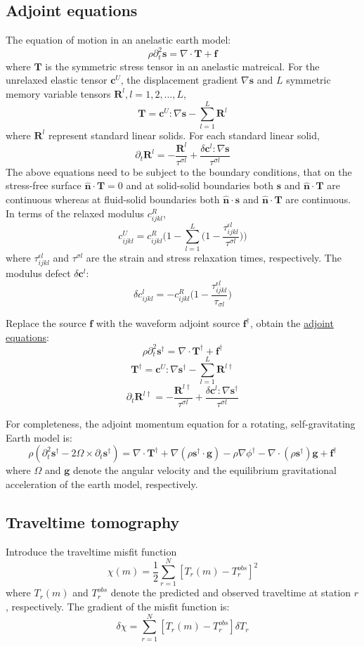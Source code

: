 \documentclass{article}
\newcommand{\mbf}[1]{\mathbf{#1}}
\newcommand{\myem}[1]{{\color{red}\uline{#1}}}
\begin{document}
\subsection{Adjoint equations}
The equation of motion in an anelastic earth model:
\[ \rho\partial_t^2\mbf s=\nabla\cdot\mbf T+\mbf f \]
where $\mbf T$ is the symmetric stress tensor in an anelastic matreical. For the unrelaxed elastic tensor $\mbf c^U$, the displacement gradient $\nabla\mbf s$ and $L$ symmetric memory variable tensors $\mbf R^l,l=1,2,\ldots,L$,
\[ \mbf T=\mbf c^U:\nabla\mbf s-\sum_{l=1}^L\mbf R^l \]
where $\mbf R^l$ represent standard linear solids. For each standard linear solid,
\[ \partial_t\mbf R^l=-\frac{\mbf R^l}{\tau^{\sigma l}}+\frac{\delta\mbf c^l:\nabla\mbf s}{\tau^{\sigma l}} \]
The above equations need to be subject to the boundary conditions, that on the stress-free surface $\hat{\mbf n}\cdot\mbf T=0$ and at solid-solid boundaries both $\mbf s$ and $\hat{\mbf n}\cdot\mbf T$ are continuous whereas at fluid-solid boundaries both $\hat{\mbf n}\cdot\mbf s$ and $\hat{\mbf n}\cdot\mbf T$ are continuous. In terms of the relaxed modulus $c_{ijkl}^R$,
\[ c_{ijkl}^U=c_{ijkl}^R\bigg(1-\sum_{l=1}^L\Big(1-\frac{\tau_{ijkl}^{\epsilon l}}{\tau^{\sigma l}}\Big)\bigg) \]
where $\tau_{ijkl}^{\epsilon l}$ and $\tau^{\sigma l}$ are the strain and stress relaxation times, respectively. The modulus defect $\delta\mbf c^l$:
\[ \delta c_{ijkl}^l=-c_{ijkl}^R\Big(1-\frac{\tau_{ijkl}^{\epsilon l}}{\tau_{\sigma l}}\Big) \]\par
Replace the source $\mbf f$ with the waveform adjoint source $\mbf f^\dagger$, obtain the \myem{adjoint equations}:
\[ \rho\partial_t^2\mbf s^\dagger=\nabla\cdot\mbf T^\dagger+\mbf f^\dagger \]
\[ \mbf T^\dagger=\mbf c^U:\nabla\mbf s^\dagger-\sum_{l=1}^L\mbf R^{l\dagger} \]
\[ \partial_t\mbf R^{l\dagger}=-\frac{\mbf R^{l\dagger}}{\tau^{\sigma l}}+\frac{\delta\mbf c^l:\nabla\mbf s^\dagger}{\tau^{\sigma l}} \]\par
For completeness, the adjoint momentum equation for a rotating, self-gravitating Earth model is:
\[ \rho(\partial_t^2\mbf s^\dagger-2\Omega\times\partial_t\mbf s^\dagger)=\nabla\cdot\mbf T^\dagger+\nabla(\rho\mbf s^\dagger\cdot\mbf g)-\rho\nabla\phi^\dagger-\nabla\cdot(\rho\mbf s^\dagger)\mbf g+\mbf f^\dagger \]
where $\Omega$ and $\mbf g$ denote the angular velocity and the equilibrium gravitational acceleration of the earth model, respectively.\par
\subsection{Traveltime tomography}
Introduce the traveltime misfit function
\[ \chi(m)=\frac{1}{2}\sum_{r=1}^N[T_r(m)-T_r^{obs}]^2 \]
where $T_r(m)$ and $T_r^{obs}$ denote the predicted and observed traveltime at station $r$, respectively. The gradient of the misfit function is:
\[ \delta\chi=\sum_{r=1}^N[T_r(m)-T_r^{obs}]\delta T_r \]\par
\end{document}
